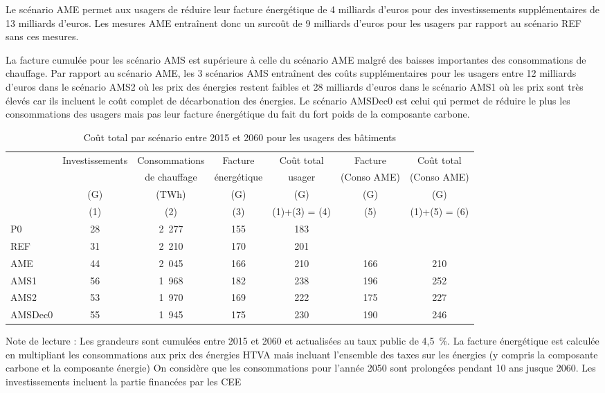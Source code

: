 \documentclass[10.5pt,a4paper]{article}
\def\euro{\mbox{\raisebox{.25ex}{{\it =}}\hspace{-.5em}{\sf C}}}
\begin{document}
{Le scénario AME permet aux usagers de réduire leur facture énergétique de 4 milliards d'euros pour des investissements supplémentaires de 13 milliards d'euros. Les mesures AME entraînent donc un surcoût de 9 milliards d'euros pour les usagers par rapport au scénario REF sans ces mesures.

La facture cumulée pour les scénario AMS est supérieure à celle du scénario AME malgré des baisses importantes des consommations de chauffage.  Par rapport au scénario AME, les 3 scénarios AMS entraînent des coûts supplémentaires pour les usagers entre 12 milliards d'euros dans le scénario AMS2 où les prix des énergies restent faibles et 28 milliards d'euros dans le scénario AMS1 où les prix sont très élevés car ils incluent le coût complet de décarbonation des énergies.  Le scénario AMSDec0 est celui qui permet de réduire le plus les consommations des usagers mais pas leur facture énergétique du fait du fort poids de la composante carbone. 

\begin{table}[h] \caption{Coût total par scénario entre 2015 et 2060 pour les usagers des bâtiments}\label{Bilan_usager}
\begin{center}
\scriptsize
\begin{tabular}[c]{|l|c|c|c|c|c|c|}
\hline
					& Investissements &  Consommations 		&	Facture  		 & Coût total & Facture 		& Coût total  \\
					&									& 	de chauffage		& énergétique & 	 usager		& (Conso AME)	&	(Conso AME) \\
					&		(G\euro)		&			(TWh)				&		(G\euro) 					& (G\euro)	 	& (G\euro) 					& (G\euro) \\
					&    (1) 				&      (2)        &      (3)            & (1)+(3) = (4) &  (5) & (1)+(5) = (6) \\
\hline
P0 				&			28				&			2~277 			&			155   					&			183  		&		  						&		\\
REF 			&			31 				&			2~210 			&			170   					&			201  		&		  						&	 \\
AME 			&			44 				&			2~045 			&			166   					&			210  		&		166  						&	210 \\
AMS1 			&			56 				&			1~968 			&			182   					&			238  		&		196  						& 252 \\
AMS2 			&			53 				&			1~970 			&			169   					&			222  		&		175  						&	227 \\
AMSDec0 	&			55 				&			1~945 			&			175   					&			230  		&		190  						&	246 \\
\hline
\end{tabular}
\end{center}
\footnotesize{Note de lecture : Les grandeurs sont cumulées entre 2015 et 2060 et actualisées au taux public de 4,5~\%.  La facture énergétique est calculée en multipliant les consommations aux prix des énergies HTVA mais incluant l'ensemble des taxes sur les énergies (y compris la composante carbone et la composante énergie)  On considère que les consommations pour l'année 2050 sont prolongées pendant 10 ans jusque 2060. Les investissements incluent la partie financées par les CEE}
\end{table}


}
\end{document}
